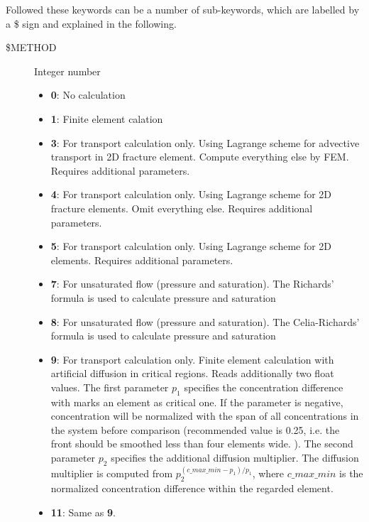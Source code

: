 Followed these keywords can be a number of sub-keywords, which are labelled by a \$ sign and
explained in the following.
\begin{description}
    \item[\$METHOD] Integer number
    {
      \begin{itemize}
      \item \textbf{0}: No calculation
      \item \textbf{1}: Finite element calation
      \item \textbf{3}: For transport calculation only. Using Lagrange scheme for advective transport in
                   2D fracture element. Compute everything else by FEM. Requires additional parameters.
      \item \textbf{4}: For transport calculation only. Using Lagrange scheme for 2D fracture elements.
                    Omit everything else. Requires additional parameters.
      \item \textbf{5}: For transport calculation only. Using Lagrange scheme for 2D elements.
                   Requires additional parameters.
      \item \textbf{7}: For unsaturated flow (pressure and saturation). The Richards' formula is used to calculate
                   pressure and saturation
      \item \textbf{8}: For unsaturated flow (pressure and saturation). The Celia-Richards' formula is used to calculate
                   pressure and saturation
      \item \textbf{9}: For transport calculation only. Finite element calculation with artificial diffusion in critical
                        regions. Reads additionally two float values. The first parameter $p_1$ specifies the
                        concentration difference with marks an element as critical one. If the parameter is negative,
                        concentration will be normalized with the span of all concentrations in the system before
                        comparison (recommended value is 0.25, i.e. the front should be smoothed less than four elements
                        wide. ). The second parameter $p_2$ specifies the additional diffusion multiplier. The diffusion
                        multiplier is computed from $p_2^{(c\_max\_min-p_1)/p_1}$, where $c\_max\_min$ is the normalized
                        concentration difference within the regarded element.
      \item \textbf{11}: Same as \textbf{9}.
      \end{itemize}
}
\end{description}
